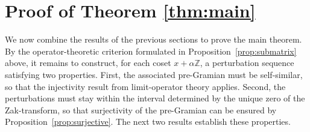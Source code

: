 \documentclass[reqno,a4paper,12pt]{amsart}
\numberwithin{equation}{section}
\newcommand\1{\mathds{1}}
\begin{document}
\section{Proof of Theorem \ref{thm:main}}

We now combine the results of the previous sections to prove the main theorem.
By the operator-theoretic criterion formulated in
Proposition~\ref{prop:submatrix} above, it remains to construct, 
for each coset $x+\alpha\mathbb Z$, a perturbation sequence satisfying two
properties. First, the associated pre-Gramian must be self-similar, so that the
injectivity result from limit-operator theory applies. Second, the
perturbations must stay within the interval determined by the unique
zero of the Zak-transform, so that  surjectivity of the pre-Gramian
can be  ensured by
Proposition~\ref{prop:surjective}. The next two results establish these
properties.
\end{document}
